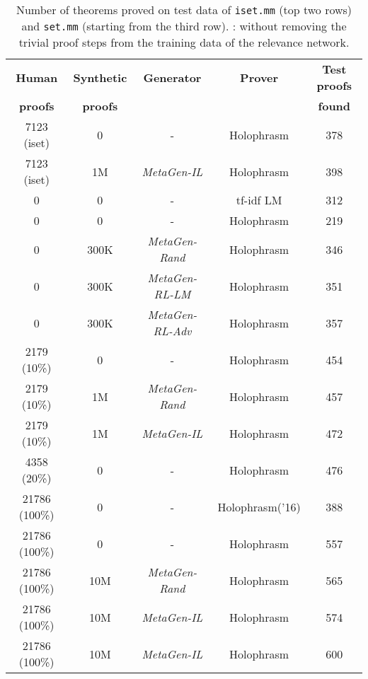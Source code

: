 \documentclass{article}
\begin{document}
\begin{table*}[t]
\caption{Number of theorems proved on test data of \texttt{iset.mm} (top two rows) and \texttt{set.mm} (starting from the third row).
: without removing the trivial proof steps from the training data of the relevance network.}
\label{table:prover}
\begin{center}
\begin{small}
\begin{sc}
\begin{tabular}{c c c c c}
\toprule
\multicolumn{1}{c}{\bf Human  } 
&\multicolumn{1}{c}{\bf Synthetic  } 
&\multicolumn{1}{c}{\bf Generator}
&\multicolumn{1}{c}{\bf Prover}
&\multicolumn{1}{c}{\bf Test proofs }
\\
\multicolumn{1}{c}{\bf  proofs } 
&\multicolumn{1}{c}{\bf  proofs } 
&\multicolumn{1}{c}{\bf }
&\multicolumn{1}{c}{\bf }
&\multicolumn{1}{c}{\bf found}
\\ \midrule
7123 (iset)& 0 & - & Holophrasm & 378 \\
7123 (iset)& 1M & \textit{MetaGen-IL}& Holophrasm & 398  \\
\midrule
0 & 0&- & tf-idf  LM & 312 \\
0 & 0&- &Holophrasm & 219 \\
0 & 300K & \textit{MetaGen-Rand} & Holophrasm & 346 \\
0 & 300K &\textit{MetaGen-RL-LM}& Holophrasm & 351  \\ 
0 & 300K &\textit{MetaGen-RL-Adv}& Holophrasm & 357  \\ 
\midrule
2179 (10\%) & 0 & -&  Holophrasm& 454  \\
2179 (10\%) & 1M&\textit{MetaGen-Rand}&Holophrasm & 457 \\
2179 (10\%) & 1M&\textit{MetaGen-IL}& Holophrasm& 472  \\ 
4358 (20\%) & 0 & -&  Holophrasm& 476  \\
\midrule
21786 (100\%)&0 & -& Holophrasm('16) & 388 \\
21786 (100\%)&0 & -&  Holophrasm& 557  \\
21786 (100\%)& 10M & \textit{MetaGen-Rand}& Holophrasm & 565 \\
21786 (100\%)& 10M & \textit{MetaGen-IL}& Holophrasm & 574  \\
21786 (100\%)& 10M & \textit{MetaGen-IL}& Holophrasm & 600  \\
\bottomrule
\end{tabular}
\end{sc}
\end{small}
\end{center}
\vskip -0.2in
\end{table*}
\end{document}

